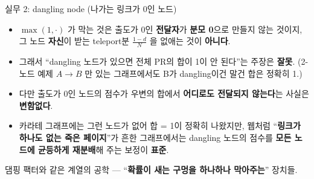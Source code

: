 \documentclass[aspectratio=169,11pt]{beamer}
\begin{document}
\begin{frame}{실무 2: dangling node (나가는 링크가 0인 노드)}
  \begin{itemize}
    \item $\max(1, \cdot)$ 가 막는 것은 출도가 0인 \textbf{전달자}가
      \textbf{분모 0}으로 만들지 않는 것이지, 그 노드 \textbf{자신}이
      받는 teleport분 $\frac{1-d}{N}$ 을 없애는 것이 \textbf{아니다}.
    \item 그래서 ``dangling 노드가 있으면 전체 PR의 합이 1이 안
      된다''는 주장은 \textbf{잘못}. (2-노드 예제 $A \to B$ 만
      있는 그래프에서도 B가 dangling이건 말건 합은 정확히 1.)
    \item 다만 출도가 0인 노드의 점수가 우변의 합에서
      \textbf{어디로도 전달되지 않는다}는 사실은 \textbf{변함없다}.
    \item 카라테 그래프에는 그런 노드가 없어 합 = 1이 정확히 나왔지만,
      웹처럼 ``\textbf{링크가 하나도 없는 죽은 페이지}''가 흔한
      그래프에서는 dangling 노드의 점수를 \textbf{모든 노드에
      균등하게 재분배}해 주는 보정이 \textbf{표준}.
  \end{itemize}
  {\footnotesize 댐핑 팩터와 같은 계열의 공학 ---
  ``\textbf{확률이 새는 구멍을 하나하나 막아주는}'' 장치들.}
\end{frame}

\end{document}
